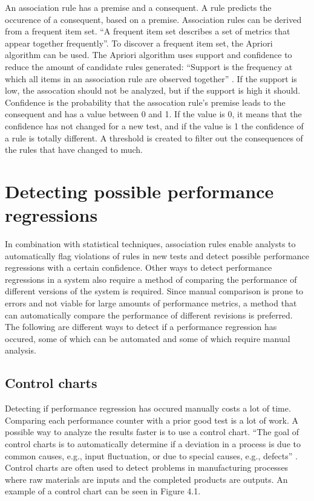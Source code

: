 An association rule has a premise and a consequent. A rule predicts the occurence of a consequent, based on a premise. Association rules can be derived from a frequent item set. ``A frequent item set describes a set of metrics that appear together frequently''\cite{foo2010mining}. To discover a frequent item set, the Apriori algorithm can be used. The Apriori algorithm uses support and confidence to reduce the amount of candidate rules generated:
``Support is the frequency at which all items in an association rule are observed together'' \cite{foo2010mining}. If the support is low, the assocation should not be analyzed, but if the support is high it should. Confidence is the probability that the assocation rule's premise leads to the consequent and has a value between 0 and 1. If the value is 0, it means that the confidence has not changed for a new test, and if the value is 1 the confidence of a rule is totally different. A threshold is created to filter out the consequences of the rules that have changed to much.

\section{Detecting possible performance regressions}
In combination with statistical techniques, association rules enable analysts to automatically flag violations of rules in new tests and detect possible performance regressions with a certain confidence. Other ways to detect performance regressions in a system also require a method of comparing the performance of different versions of the system is required. Since manual comparison is prone to errors and not viable for large amounts of performance metrics, a method that can automatically compare the performance of different revisions is preferred. The following are different ways to detect if a performance regression has occured, some of which can be automated and some of which require manual analysis.

\subsection{Control charts}
Detecting if performance regression has occured manually costs a lot of time. Comparing each performance counter with a prior good test is a lot of work. A possible way to analyze the results faster is to use a control chart.
``The goal of control charts is to automatically determine if a deviation in a process is due to common causes, e.g., input fluctuation, or due to special causes, e.g., defects'' \cite{nguyen2012using}. Control charts are often used to detect problems in manufacturing processes where raw materials are inputs and the completed products are outputs. An example of a control chart can be seen in Figure 4.1.

